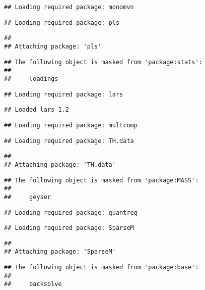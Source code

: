 \documentclass[11pt,]{article}
\begin{document}
\begin{verbatim}
## Loading required package: monomvn
\end{verbatim}

\begin{verbatim}
## Loading required package: pls
\end{verbatim}

\begin{verbatim}
## 
## Attaching package: 'pls'
\end{verbatim}

\begin{verbatim}
## The following object is masked from 'package:stats':
## 
##     loadings
\end{verbatim}

\begin{verbatim}
## Loading required package: lars
\end{verbatim}

\begin{verbatim}
## Loaded lars 1.2
\end{verbatim}

\begin{verbatim}
## Loading required package: multcomp
\end{verbatim}

\begin{verbatim}
## Loading required package: TH.data
\end{verbatim}

\begin{verbatim}
## 
## Attaching package: 'TH.data'
\end{verbatim}

\begin{verbatim}
## The following object is masked from 'package:MASS':
## 
##     geyser
\end{verbatim}

\begin{verbatim}
## Loading required package: quantreg
\end{verbatim}

\begin{verbatim}
## Loading required package: SparseM
\end{verbatim}

\begin{verbatim}
## 
## Attaching package: 'SparseM'
\end{verbatim}

\begin{verbatim}
## The following object is masked from 'package:base':
## 
##     backsolve
\end{verbatim}
\end{document}
